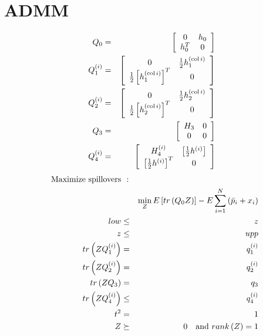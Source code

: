\documentclass{article}
\begin{document}
\section{ADMM}

\begin{eqnarray*}
Q_{0} &=&\left[ 
\begin{array}{cc}
0 & h_{0} \\ 
h_{0}^{T} & 0%
\end{array}%
\right] \\
Q_{1}^{\left( i\right) } &=&\left[ 
\begin{array}{cc}
0 & \frac{1}{2}h_{1}^{\left( \func{col}i\right) } \\ 
\frac{1}{2}\left[ h_{1}^{\left( \func{col}i\right) }\right] ^{T} & 0%
\end{array}%
\right] \\
Q_{2}^{\left( i\right) } &=&\left[ 
\begin{array}{cc}
0 & \frac{1}{2}h_{2}^{\left( \func{col}i\right) } \\ 
\frac{1}{2}\left[ h_{2}^{\left( \func{col}i\right) }\right] ^{T} & 0%
\end{array}%
\right] \\
Q_{3} &=&\left[ 
\begin{array}{cc}
H_{3} & 0 \\ 
0 & 0%
\end{array}%
\right] \\
Q_{4}^{\left( i\right) } &=&\left[ 
\begin{array}{cc}
H_{4}^{\left( i\right) } & \left[ \frac{1}{2}h^{\left( i\right) }\right] \\ 
\left[ \frac{1}{2}h^{\left( i\right) }\right] ^{T} & 0%
\end{array}%
\right]
\end{eqnarray*}%
\begin{eqnarray*}
\text{Maximize spillovers} &\text{:}& \\
&&\min_{Z}E\left[ tr\left( Q_{0}Z\right) \right] -E\sum_{i=1}^{N}\left( \bar{%
p}_{i}+x_{i}\right) \\
low &\leq &z \\
z &\leq &upp \\
tr\left( ZQ_{1}^{\left( i\right) }\right) &=&q_{1}^{\left( i\right) } \\
tr\left( ZQ_{2}^{\left( i\right) }\right) &=&q_{2}^{\left( i\right) } \\
tr\left( ZQ_{3}\right) &=&q_{3} \\
tr\left( ZQ_{4}^{\left( i\right) }\right) &\leq &q_{4}^{\left( i\right) } \\
t^{2} &=&1 \\
Z &\succeq &0\text{ and }rank\left( Z\right) =1
\end{eqnarray*}
\end{document}
